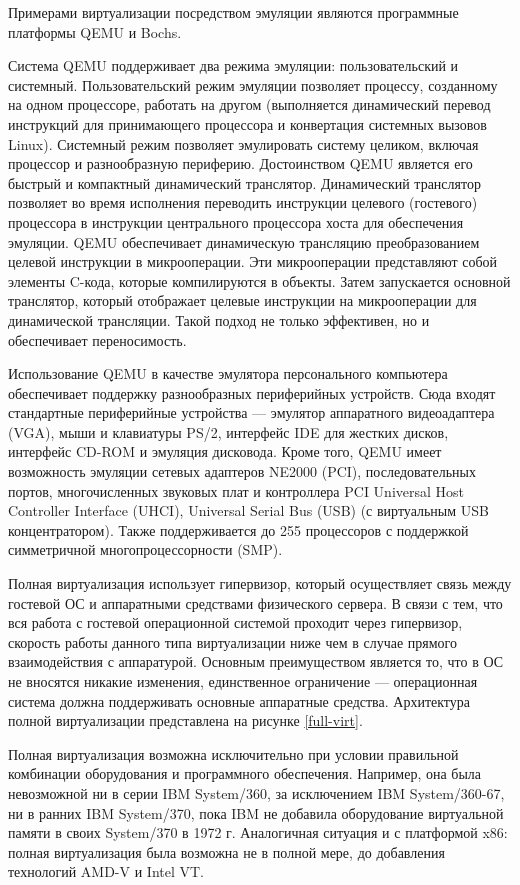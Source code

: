Примерами виртуализации посредством эмуляции являются программные платформы QEMU и Bochs.

Система QEMU поддерживает два режима эмуляции: пользовательский и системный.
Пользовательский режим эмуляции позволяет процессу, созданному на одном процессоре, работать на другом (выполняется динамический перевод инструкций для принимающего процессора и конвертация системных вызовов Linux).
Системный режим позволяет эмулировать систему целиком, включая процессор и разнообразную периферию.
Достоинством QEMU является его быстрый и компактный динамический транслятор.
Динамический транслятор позволяет во время исполнения переводить инструкции целевого (гостевого) процессора в инструкции центрального процессора хоста для обеспечения эмуляции.
QEMU обеспечивает динамическую трансляцию преобразованием целевой инструкции в микрооперации.
Эти микрооперации представляют собой элементы C-кода, которые компилируются в объекты.
Затем запускается основной транслятор, который отображает целевые инструкции на микрооперации для динамической трансляции.
Такой подход не только эффективен, но и обеспечивает переносимость.

Использование QEMU в качестве эмулятора персонального компьютера обеспечивает поддержку разнообразных периферийных устройств.
Сюда входят стандартные периферийные устройства --- эмулятор аппаратного видеоадаптера (VGA), мыши и клавиатуры PS/2, интерфейс IDE для жестких дисков, интерфейс CD-ROM и эмуляция дисковода.
Кроме того, QEMU имеет возможность эмуляции сетевых адаптеров NE2000 (PCI), последовательных портов, многочисленных звуковых плат и контроллера PCI Universal Host Controller Interface (UHCI), Universal Serial Bus (USB) (с виртуальным USB концентратором).
Также поддерживается до 255 процессоров с поддержкой симметричной многопроцессорности (SMP).

Полная виртуализация использует гипервизор, который осуществляет связь между гостевой ОС и аппаратными средствами физического сервера.
В связи с тем, что вся работа с гостевой операционной системой проходит через гипервизор, скорость работы данного типа виртуализации ниже чем в случае прямого взаимодействия с аппаратурой.
Основным преимуществом является то, что в ОС не вносятся никакие изменения, единственное ограничение --- операционная система должна поддерживать основные аппаратные средства.
Архитектура полной виртуализации представлена на рисунке \ref{full-virt}.

Полная виртуализация возможна исключительно при условии правильной комбинации оборудования и программного обеспечения.
Например, она была невозможной ни в серии IBM System/360, за исключением IBM System/360-67, ни в ранних IBM System/370, пока IBM не добавила оборудование виртуальной памяти в своих System/370 в 1972 г.
Аналогичная ситуация и с платформой x86: полная виртуализация была возможна не в полной мере, до добавления технологий AMD-V и Intel VT.

